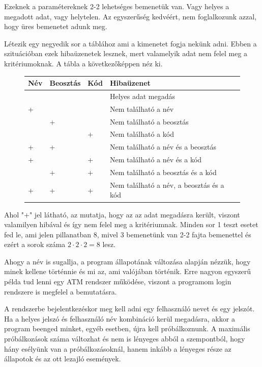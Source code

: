 Ezeknek a paramétereknek 2-2 lehetséges bemenetük van. Vagy helyes a megadott adat, vagy helytelen. Az egyszerűség kedvéért, nem foglalkozunk azzal, hogy üres bemenetet adunk meg.

Létezik egy negyedik sor a táblához ami a kimenetet fogja nekünk adni. Ebben a szituációban ezek hibaüzenetek lesznek, mert valamelyik adat nem felel meg a kritériumoknak. A tábla a következőképpen néz ki.

\begin{figure} [h]
	\begin{center}
		\begin{tabular}{| p{2cm} | p{2cm} | p{2cm} | p{5cm} |}
			\hline
			Név & Beosztás & Kód & Hibaüzenet\\
			\hline
			& & & Helyes adat megadás\\
			\hline
			+ & & & Nem található a név\\
			\hline
			& + & & Nem található a beosztás\\
			\hline
			&  & + & Nem található a kód\\
			\hline
			+ & + & & Nem található a név és a beosztás\\
			\hline
			+ & & + & Nem található a név és a kód\\
			\hline
			& + &  +& Nem található a beosztás és a kód\\
			\hline
			+ & + & + & Nem található a név, a beosztás és a kód\\
			\hline
		\end{tabular}
	\end{center}
\end{figure}

Ahol "+" jel látható, az mutatja, hogy az az adat megadásra került, viszont valamilyen hibával és így nem felel meg a kritériumnak. Minden sor 1 teszt esetet fed le, ami jelen pillanatban 8, mivel 3 bemenetünk van 2-2 fajta bemenettel és ezért a sorok száma $2 \cdot 2 \cdot 2 = 8$ lesz.


Ahogy a név is sugallja, a program állapotának változása alapján nézzük, hogy minek kellene történnie és mi az, ami valójában történik. Erre nagyon egyszerű példa tud lenni egy ATM rendszer működése, viszont a programom login rendszere is megfelel a bemutatásra.

A rendszerbe bejelentkezéskor meg kell adni egy felhasználó nevet és egy jelszót. Ha a helyes jelszó és felhasználó név kombináció kerül megadásra, akkor a program beenged minket, egyéb esetben, újra kell próbálkoznunk. A maximális próbálkozások száma változhat és nem is lényeges abból a szempontból, hogy hány esélyünk van a próbálkozásoknál, hanem inkább a lényeges része az állapotok és az ott lezajló események.

